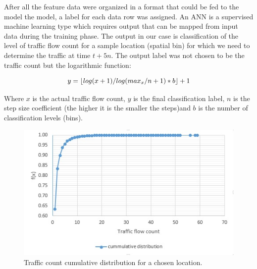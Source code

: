 \documentclass[12pt, a4paper]{report}
\theoremstyle{definition}
\theoremstyle{definition}%
\theoremstyle{definition}%
\theoremstyle{definition}%
\theoremstyle{definition}%
\theoremstyle{definition}%
\begin{document}
After all the feature data were organized in a format that could be fed to the model the model, a label for each data row was assigned. An ANN is a supervised machine learning type which requires output that can be mapped from input data during the training phase. The output in our case is classification of the level of traffic flow count for a sample location (spatial bin) for which we need to determine the traffic at time $t + 5n$. The output label was not chosen to be the traffic count but the logarithmic function: 

\begin{equation} \label{equation:logarithmic_step_function}
y=\lfloor{log(x+1)/log(max_x/n + 1) * b}\rfloor + 1  \\
\end{equation}

Where $x$ is the actual traffic flow count, $y$ is the final classification label, $n$ is the step size coefficient (the higher it is the smaller the steps)and $b$ is the number of classification levels (bins). 

\begin{figure}[h]	
	\includegraphics[scale=0.75]{traffic_count_cumm_distribution.jpg}
	\centering
	\caption{Traffic count cumulative distribution for a chosen location. }
	\label{fig:traffic_count_distribution_distribution}
\end{figure}
\end{document}
